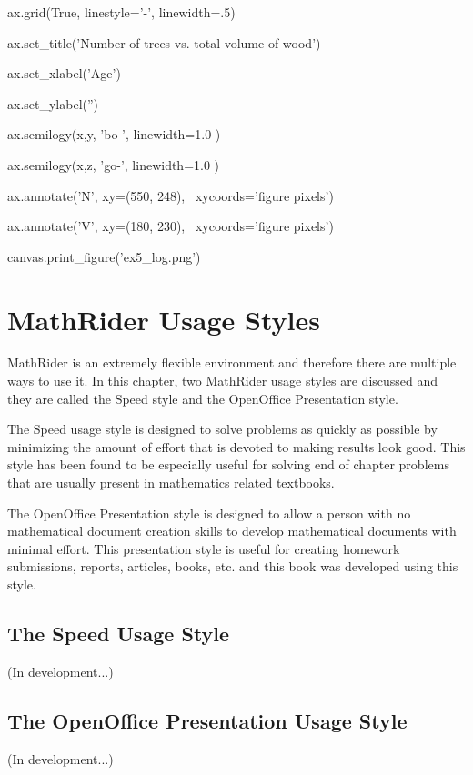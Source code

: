 \documentclass[12pt,oneside]{book}
\begin{document}
ax.grid(True, linestyle='{}-',
linewidth=.5)

ax.set\_title('Number of trees vs. total volume of
wood')

ax.set\_xlabel('Age')

ax.set\_ylabel('')

ax.semilogy(x,y, 'bo{}-',
linewidth=1.0 )

ax.semilogy(x,z, 'go{}-',
linewidth=1.0 )

ax.annotate('N', xy=(550, 248),
\ xycoords='figure pixels')

ax.annotate('V', xy=(180, 230),
\ xycoords='figure pixels')

canvas.print\_figure('ex5\_log.png')

{\textbar}


\chapter[MathRider Usage Styles]{MathRider Usage Styles}

MathRider is an extremely flexible environment and therefore there are multiple ways to use it. In this chapter, two MathRider usage styles are discussed and they are called the Speed style and the OpenOffice Presentation style. 

The Speed usage style is designed to solve problems as quickly as possible by minimizing the amount of effort that is devoted to making results look good. This style has been found to be especially useful for solving end of chapter problems that are usually present in mathematics related textbooks. 

The OpenOffice Presentation style is designed to allow a person with no mathematical document creation skills to develop mathematical documents with minimal effort. This presentation style is useful for creating homework submissions, reports, articles, books, etc. and this book was developed using this style.

\section[The Speed Usage Style]{The Speed Usage Style} (In development...)

\section[The OpenOffice Presentation Usage Style]{The OpenOffice Presentation Usage Style}

(In development...)
\end{document}
